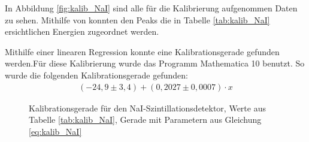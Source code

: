 \documentclass[
	parskip=half,10pt,
	numbers= noenddot, %
	toc=flat, %
	oneside,
	twocolumn,
	]{scrartcl}
\begin{document}
In Abbildung \ref{fig:kalib_NaI} sind alle für die Kalibrierung aufgenommen Daten zu sehen. Mithilfe von \cite{kohlrausch} konnten den Peaks die in Tabelle 
\ref{tab:kalib_NaI} ersichtlichen Energien zugeordnet werden. 


Mithilfe einer linearen Regression konnte eine Kalibrationsgerade gefunden werden.Für diese Kalibrierung wurde das Programm Mathematica 10 benutzt. 
So wurde die folgenden Kalibrationsgerade gefunden:
\begin{align}
(-24,9 \pm 3,4) + (0,2027 \pm 0,0007) \cdot x
\label{eq:kalib_NaI}
\end{align}


\begin{figure}[h]
\begin{center}
\end{center} 
\caption{Kalibrationsgerade für den NaI-Szintillationsdetektor, Werte aus Tabelle \ref{tab:kalib_NaI}, Gerade mit Parametern aus Gleichung \ref{eq:kalib_NaI}}
\label{fig:Kalibrationsgerade_NaI}
\end{figure}
\end{document}
